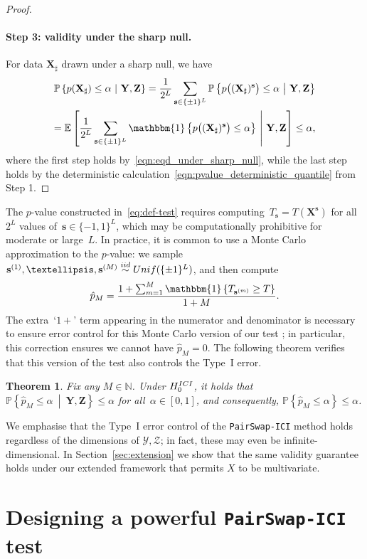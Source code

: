 \documentclass[12pt]{article}
\newtheorem{theorem}{Theorem}%
\newcommand{\EEst}[2]{\mathbb{E}\left[{#1}\  \middle| \ {#2}\right]}
\newcommand{\PP}[1]{\mathbb{P}\left\{{#1}\right\}}
\newcommand{\PPst}[2]{\mathbb{P}\left\{{#1}\  \middle| \ {#2}\right\}}
\newcommand{\One}[1]{{\mathbbm{1}}\left\{{#1}\right\}}
\newcommand{\iidsim}{\stackrel{\textnormal{iid}}{\sim}}
\newcommand{\Ycal}{\mathcal{Y}}
\newcommand{\Zcal}{\mathcal{Z}}
\newcommand{\bs}{\mathbf{s}}
\newcommand{\bX}{\mathbf{X}}
\newcommand{\bY}{\mathbf{Y}}
\newcommand{\bZ}{\mathbf{Z}}
\begin{document}
\begin{proof}
\paragraph{Step 3: validity under the sharp null.} 
For  data $\bX_\sharp$ drawn under a sharp null, we have
\begin{multline*} \PPst{p(\bX_\sharp)\leq \alpha}{\bY,\bZ}= \frac{1}{2^L}\sum_{\bs\in\{\pm 1\}^L}\PPst{p\bigl((\bX_\sharp)^\bs\bigr) \leq \alpha}{\bY,\bZ} \\= \EEst{\frac{1}{2^L}\sum_{\bs\in\{\pm 1\}^L}\One{p\bigl((\bX_\sharp)^\bs\bigr) \leq \alpha} }{\bY,\bZ} \leq \alpha,\end{multline*}
where the first step holds by~\eqref{eqn:eqd_under_sharp_null}, while the last step holds by the deterministic calculation~\eqref{eqn:pvalue_deterministic_quantile} from Step 1. 
\end{proof}

The $p$-value constructed in~\eqref{eq:def-test} requires computing~$T_\bs = T(\bX^\bs)$ for all~$2^L$ values of~$\bs\in \{-1,1\}^L$, which may be computationally prohibitive for moderate or large~$L$. In practice, it is common to use a Monte Carlo approximation to the $p$-value: we sample~$\bs^{(1)}, \ldots, \bs^{(M)}\iidsim \textnormal{Unif}(\{\pm1\}^L)$, and then compute 
\[
\hat{p}_M = \frac{1+\sum_{m=1}^M \One{T_{\bs^{(m)}}\ge T}}{1+M}.
\]
The extra~`$1+$' term appearing in the numerator and denominator is necessary to ensure error control for this Monte Carlo version of our test \citep{davison1997bootstrap,phipson2010permutation}; in particular, this correction ensures we cannot have $\hat{p}_M=0$. The following theorem verifies that this version of the test also controls the Type~I error.


\begin{theorem}\label{thm:mc-validity}
 Fix any $M\in \mathbb{N}$. Under $H_0^{\textnormal{ICI}}$, it holds that $\PPst{\hat{p}_M\le \alpha }{\bY,\bZ}\le \alpha$ for all~$\alpha \in [0,1]$, and consequently, $\PP{\hat{p}_M\leq \alpha}\leq \alpha$.
\end{theorem}


We emphasise that the Type~I error control of the \texttt{PairSwap-ICI} method holds regardless of the dimensions of $\Ycal,\Zcal$; in fact, these may even be infinite-dimensional.  In Section~\ref{sec:extension} we show that the same validity guarantee holds under our extended framework that permits $X$ to be multivariate.  
\section{Designing a powerful \textnormal{\texttt{PairSwap-ICI}} test}\label{sec:design}
\end{document}
